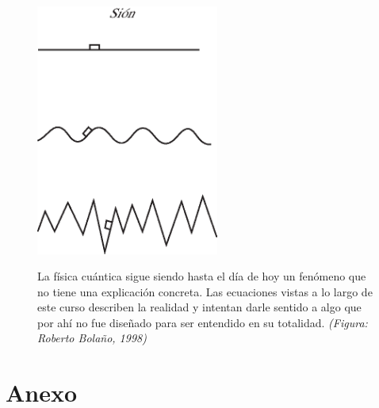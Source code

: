 \documentclass[10pt,twocolumn,titlepage]{article}
\begin{document}
\begin{figure}[!htb]
\centering
\includegraphics[width=6cm]{sion.eps}
\label{fig:sion}
\caption{La física cuántica sigue siendo hasta el día de hoy un fenómeno que no tiene una explicación concreta. Las ecuaciones vistas a lo largo de este curso describen la realidad y intentan darle sentido a algo que por ahí no fue diseñado para ser entendido en su totalidad. \emph{(Figura: Roberto Bolaño, 1998)}}
\end{figure}
\clearpage
\part{Anexo}
\end{document}
